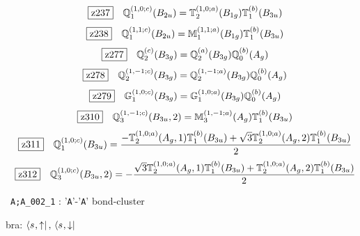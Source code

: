 \documentclass[fleqn,10pt,landscape]{jsarticle}
\begin{document}
\begin{dmath*}
\hspace*{3mm}\fbox{z237}\quad \mathbb{Q}_{1}^{(1,0;c)}(B_{2u})=\mathbb{T}_{2}^{(1,0;a)}(B_{1g}) \mathbb{T}_{1}^{(b)}(B_{3u})
\end{dmath*}
\begin{dmath*}
\hspace*{3mm}\fbox{z238}\quad \mathbb{Q}_{1}^{(1,1;c)}(B_{2u})=\mathbb{M}_{1}^{(1,1;a)}(B_{1g}) \mathbb{T}_{1}^{(b)}(B_{3u})
\end{dmath*}
\begin{dmath*}
\hspace*{3mm}\fbox{z277}\quad \mathbb{Q}_{2}^{(c)}(B_{3g})=\mathbb{Q}_{2}^{(a)}(B_{3g}) \mathbb{Q}_{0}^{(b)}(A_{g})
\end{dmath*}
\begin{dmath*}
\hspace*{3mm}\fbox{z278}\quad \mathbb{Q}_{2}^{(1,-1;c)}(B_{3g})=\mathbb{Q}_{2}^{(1,-1;a)}(B_{3g}) \mathbb{Q}_{0}^{(b)}(A_{g})
\end{dmath*}
\begin{dmath*}
\hspace*{3mm}\fbox{z279}\quad \mathbb{G}_{1}^{(1,0;c)}(B_{3g})=\mathbb{G}_{1}^{(1,0;a)}(B_{3g}) \mathbb{Q}_{0}^{(b)}(A_{g})
\end{dmath*}
\begin{dmath*}
\hspace*{3mm}\fbox{z310}\quad \mathbb{Q}_{3}^{(1,-1;c)}(B_{3u},2)=\mathbb{M}_{3}^{(1,-1;a)}(A_{g}) \mathbb{T}_{1}^{(b)}(B_{3u})
\end{dmath*}
\begin{dmath*}
\hspace*{3mm}\fbox{z311}\quad \mathbb{Q}_{1}^{(1,0;c)}(B_{3u})=\frac{- \mathbb{T}_{2}^{(1,0;a)}(A_{g},1) \mathbb{T}_{1}^{(b)}(B_{3u}) + \sqrt{3} \mathbb{T}_{2}^{(1,0;a)}(A_{g},2) \mathbb{T}_{1}^{(b)}(B_{3u})}{2}
\end{dmath*}
\begin{dmath*}
\hspace*{3mm}\fbox{z312}\quad \mathbb{Q}_{3}^{(1,0;c)}(B_{3u},2)=- \frac{\sqrt{3} \mathbb{T}_{2}^{(1,0;a)}(A_{g},1) \mathbb{T}_{1}^{(b)}(B_{3u}) + \mathbb{T}_{2}^{(1,0;a)}(A_{g},2) \mathbb{T}_{1}^{(b)}(B_{3u})}{2}
\end{dmath*}
\vspace{5mm}

\noindent\textbullet\, \texttt{A;A_002_1} : '\texttt{A}'-'\texttt{A}' bond-cluster

\noindent\quad * bra: $\bra{s_{},\uparrow},\, \bra{s_{},\downarrow}$
\end{document}
